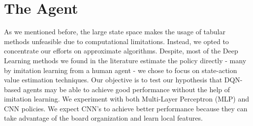 \documentclass[journal, a4paper]{IEEEtran}
\begin{document}




\section{The Agent}

As we mentioned before, the large state space makes the usage of tabular methods unfeasible due to computational limitations. Instead, we opted to concentrate our efforts on approximate algorithms. Despite, most of the Deep Learning methods we found in the literature estimate the policy directly - many by imitation learning from a human agent - we chose to focus on state-action value estimation techniques. Our objective is to test our hypothesis that DQN-based agents may be able to achieve good performance without the help of imitation learning. We experiment with both Multi-Layer Perceptron (MLP) and CNN policies. We expect CNN's to achieve better performance because they can take advantage of the board organization and learn local features.


\end{document}
